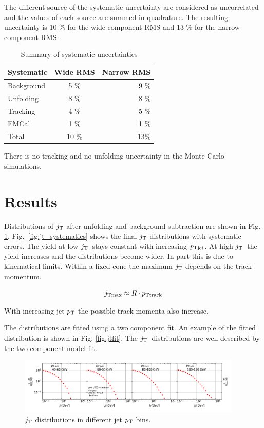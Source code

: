 The different source of the systematic uncertainty are considered as uncorrelated and the values of each source are summed in quadrature. The resulting uncertainty is 10 \% for the wide component RMS and 13 \% for the narrow component RMS.


\begin{table}[htb]
\centering
\caption{Summary of systematic uncertainties}
\label{tab:systematics}
\begin{tabular}{ l | c | r }
  Systematic & Wide RMS & Narrow RMS \\
    \hline			
  Background & 5 \% & 9 \% \\
  Unfolding & 8 \% & 8 \% \\
  Tracking & 4 \% & 5 \% \\ 
  EMCal & 1 \% & 1 \% \\
  Total & 10 \% & 13\% \\
  \hline
  \end{tabular}
  \end{table}

There is no tracking and no unfolding uncertainty in the Monte Carlo simulations.

\section{Results}
\label{sec:results}

Distributions of $j_{\rm T}$ after unfolding and background subtraction are shown in Fig. \ref{fig:jtdist}. Fig.~\ref{fig:jt_systematics} shows the final $j_{\rm T}$ distributions with systematic errors.
The yield at low $j_{\rm T}$ stays constant with increasing $p_{\rm Tjet}$. At high $j_{\rm T}$ the yield increases and the distributions become wider. In part this is due to kinematical limits. Within a fixed cone the maximum $j_{\rm T}$ depends on the track momentum.

$$j_{\rm Tmax} \approx R \cdot p_{\rm Ttrack}$$

With increasing jet $p_{\rm T}$ the possible track momenta also increase. 


The distributions are fitted using a two component fit. An example of the fitted distribution is shown in Fig. \ref{fig:jtfit}. The $j_{\rm T}$ distributions are well described by the two component model fit.

\begin{figure}[htb]
\begin{center}
\includegraphics[width=0.95\textwidth]{figures/results/MixedFullJetsR04JetConeJtSignalPtFrom4To8.pdf}
\caption{$j_{\rm T}$ distributions in different jet $p_{\rm T}$ bins.}
\label{fig:jtdist}
\end{center}
\end{figure}

